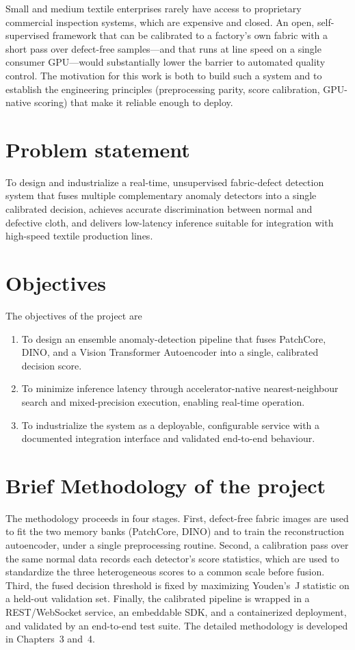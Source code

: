 Small and medium textile enterprises rarely have access to proprietary commercial inspection systems, which are expensive and closed. An open, self-supervised framework that can be calibrated to a factory's own fabric with a short pass over defect-free samples---and that runs at line speed on a single consumer GPU---would substantially lower the barrier to automated quality control. The motivation for this work is both to build such a system and to establish the engineering principles (preprocessing parity, score calibration, GPU-native scoring) that make it reliable enough to deploy.

\section[Problem statement]{\textbf{Problem statement}}

To design and industrialize a real-time, unsupervised fabric-defect detection system that fuses multiple complementary anomaly detectors into a single calibrated decision, achieves accurate discrimination between normal and defective cloth, and delivers low-latency inference suitable for integration with high-speed textile production lines.

\section[Objectives]{\textbf{Objectives}}
The objectives of the project are
\begin{enumerate}
\item To design an ensemble anomaly-detection pipeline that fuses PatchCore, DINO, and a Vision Transformer Autoencoder into a single, calibrated decision score.
\item To minimize inference latency through accelerator-native nearest-neighbour search and mixed-precision execution, enabling real-time operation.
\item To industrialize the system as a deployable, configurable service with a documented integration interface and validated end-to-end behaviour.
\end{enumerate}

\section[Brief Methodology of the project]{\textbf{Brief Methodology of the project}}

The methodology proceeds in four stages. First, defect-free fabric images are used to fit the two memory banks (PatchCore, DINO) and to train the reconstruction autoencoder, under a single preprocessing routine. Second, a calibration pass over the same normal data records each detector's score statistics, which are used to standardize the three heterogeneous scores to a common scale before fusion. Third, the fused decision threshold is fixed by maximizing Youden's~J statistic on a held-out validation set. Finally, the calibrated pipeline is wrapped in a REST/WebSocket service, an embeddable SDK, and a containerized deployment, and validated by an end-to-end test suite. The detailed methodology is developed in Chapters~3 and~4.

